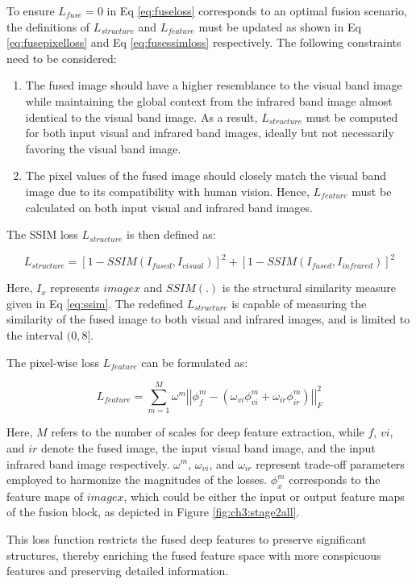 To ensure $L_{fuse} = 0 $ in Eq \ref{eq:fuseloss} corresponds to an optimal fusion scenario, the definitions of $L_{structure}$ and $L_{feature}$ must be updated as shown in Eq \ref{eq:fusepixelloss} and Eq \ref{eq:fusessimloss} respectively. The following constraints need to be considered:

\begin{enumerate}
    \item The fused image should have a higher resemblance to the visual band image while maintaining the global context from the infrared band image almost identical to the visual band image. As a result, $L_{structure}$ must be computed for both input visual and infrared band images, ideally but not necessarily favoring the visual band image.
    \item The pixel values of the fused image should closely match the visual band image due to its compatibility with human vision. Hence, $L_{feature}$ must be calculated on both input visual and infrared band images.
\end{enumerate}

The SSIM loss $L_{structure}$ is then defined as:

\begin{equation} \label{eq:fusessimloss}
    L_{structure} = \left[1- SSIM(I_{fused},I_{visual})\right]^2 + \left[1- SSIM(I_{fused},I_{infrared})\right]^2
\end{equation}

Here, $I_x$ represents $image x$ and $SSIM(.)$ is the structural similarity measure \cite{ma2015perceptual} given in Eq \ref{eq:ssim}. The redefined $L_{structure}$ is capable of measuring the similarity of the fused image to both visual and infrared images, and is limited to the interval $(0,8]$.

The pixel-wise loss $L_{feature}$ can be formulated as:

\begin{equation} \label{eq:fusepixelloss}
    L_{feature} = \sum_{m=1}^{M} \omega^m \left\lvert \left\lvert \phi_f^m - \left(\omega_{vi}\phi_{vi}^{m} + \omega_{ir}\phi_{ir}^{m}\right) \right\rvert \right\rvert _{F}^{2}
\end{equation}

Here, $M$ refers to the number of scales for deep feature extraction, while $f$, $vi$, and $ir$ denote the fused image, the input visual band image, and the input infrared band image respectively. $\omega^m$, $\omega_{vi}$, and $\omega_{ir}$ represent trade-off parameters employed to harmonize the magnitudes of the losses. $\phi_{x}^{m}$ corresponds to the feature maps of $image x$, which could be either the input or output feature maps of the fusion block, as depicted in Figure \ref{fig:ch3:stage2all}.

This loss function restricts the fused deep features to preserve significant structures, thereby enriching the fused feature space with more conspicuous features and preserving detailed information.